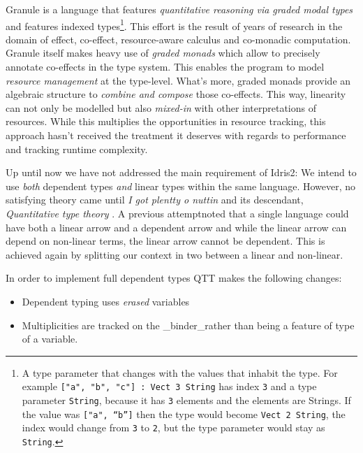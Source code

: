\documentclass[
]{article}
\providecommand{\tightlist}{%
  \setlength{\itemsep}{0pt}\setlength{\parskip}{0pt}}
\begin{document}
Granule is a language that features \emph{quantitative reasoning via
graded modal types} and features indexed types\footnote{A type parameter
  that changes with the values that inhabit the type. For example
  \texttt{{[}"a",\ "b",\ "c"{]}\ :\ Vect\ 3\ String} has index
  \texttt{3} and a type parameter \texttt{String}, because it has
  \texttt{3} elements and the elements are Strings. If the value was
  \texttt{{[}\textasciigrave{}"a",\ “b”{]}} then the type would become
  \texttt{Vect\ 2\ String}, the index would change from \texttt{3} to
  \texttt{2}, but the type parameter would stay as \texttt{String}.}.
This effort is the result of years of research in the domain of effect,
co-effect, resource-aware calculus and co-monadic
computation\cite{monad_or_comonad}. Granule itself makes heavy use of
\emph{graded monads}\cite{effect_coeffects_grading} which allow to
precisely annotate co-effects\cite{coeffect_computation} in the type
system. This enables the program to model \emph{resource management} at
the type-level. What's more, graded monads provide an algebraic
structure to \emph{combine and compose} those
co-effects\cite{quantitative_coeffects}. This way, linearity can not
only be modelled but also \emph{mixed-in} with other interpretations of
resources. While this multiplies the opportunities in resource tracking,
this approach hasn't received the treatment it deserves with regards to
performance and tracking runtime complexity.

Up until now we have not addressed the main requirement of Idris2: We
intend to use \emph{both} dependent types \emph{and} linear types within
the same language. However, no satisfying theory came until \emph{I got
plentty o nuttin}\cite{nuttin} and its descendant, \emph{Quantitative
type theory} \cite{qtt}. A previous
attempt\cite{integrating_linear_dependent}noted that a single language
could have both a linear arrow and a dependent arrow and while the
linear arrow can depend on non-linear terms, the linear arrow cannot be
dependent. This is achieved again by splitting our context in two
between a linear and non-linear.

In order to implement full dependent types QTT makes the following
changes:

\begin{itemize}
\tightlist
\item
  Dependent typing uses \emph{erased} variables
\item
  Multiplicities are tracked on the \_binder\_rather than being a
  feature of type of a variable.
\end{itemize}
\end{document}

